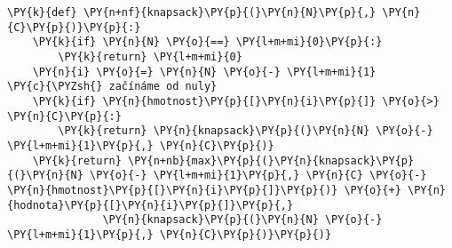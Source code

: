 \begin{Verbatim}[commandchars=\\\{\}]
\PY{k}{def} \PY{n+nf}{knapsack}\PY{p}{(}\PY{n}{N}\PY{p}{,} \PY{n}{C}\PY{p}{)}\PY{p}{:}
	\PY{k}{if} \PY{n}{N} \PY{o}{==} \PY{l+m+mi}{0}\PY{p}{:}
		\PY{k}{return} \PY{l+m+mi}{0}
	\PY{n}{i} \PY{o}{=} \PY{n}{N} \PY{o}{-} \PY{l+m+mi}{1}                           \PY{c}{\PYZsh{} začínáme od nuly}
	\PY{k}{if} \PY{n}{hmotnost}\PY{p}{[}\PY{n}{i}\PY{p}{]} \PY{o}{>} \PY{n}{C}\PY{p}{:}
		\PY{k}{return} \PY{n}{knapsack}\PY{p}{(}\PY{n}{N} \PY{o}{-} \PY{l+m+mi}{1}\PY{p}{,} \PY{n}{C}\PY{p}{)}
	\PY{k}{return} \PY{n+nb}{max}\PY{p}{(}\PY{n}{knapsack}\PY{p}{(}\PY{n}{N} \PY{o}{-} \PY{l+m+mi}{1}\PY{p}{,} \PY{n}{C} \PY{o}{-} \PY{n}{hmotnost}\PY{p}{[}\PY{n}{i}\PY{p}{]}\PY{p}{)} \PY{o}{+} \PY{n}{hodnota}\PY{p}{[}\PY{n}{i}\PY{p}{]}\PY{p}{,}
	           \PY{n}{knapsack}\PY{p}{(}\PY{n}{N} \PY{o}{-} \PY{l+m+mi}{1}\PY{p}{,} \PY{n}{C}\PY{p}{)}\PY{p}{)}
\end{Verbatim}
